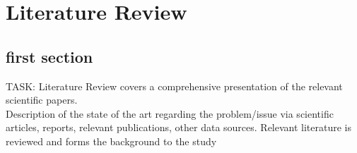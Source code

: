 \chapter{Literature Review} \label{ch:litrev}



\section{first section} \label{sec:sectionlabel}

TASK: Literature Review covers a comprehensive presentation of the relevant scientific papers.\\

Description of the state of the art regarding the problem/issue via scientific articles, reports, relevant publications, other data sources. Relevant literature is reviewed and forms the background to the study